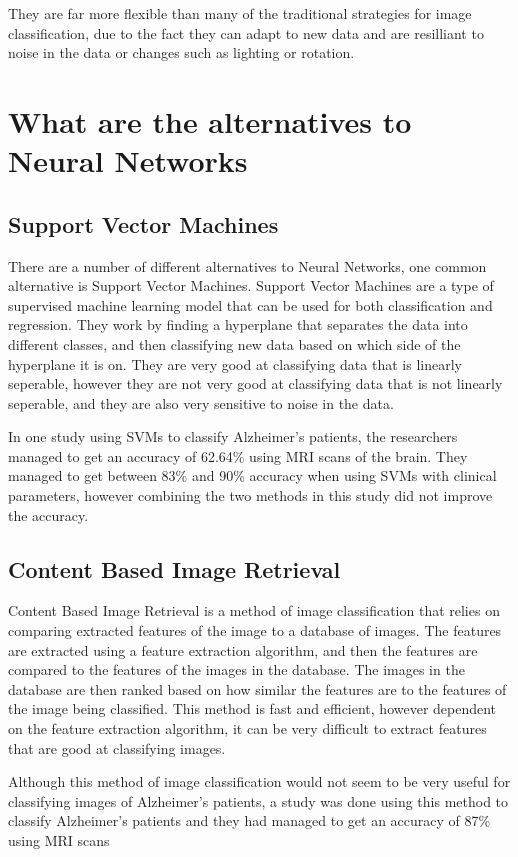 \documentclass[]{final_report}
\begin{document}
They are far more flexible than many of the traditional strategies for image classification, due to the fact they can adapt to new data and are
resilliant to noise in the data or changes such as lighting or rotation.

\pagebreak
\section{What are the alternatives to Neural Networks}
\subsection{Support Vector Machines}
There are a number of different alternatives to Neural Networks, one common alternative is Support Vector Machines.
Support Vector Machines are a type of supervised machine learning model that can be used for both classification and regression.
They work by finding a hyperplane that separates the data into different classes, and then classifying new data based on which side of the hyperplane it is on.
They are very good at classifying data that is linearly seperable, however they are not very good at classifying data that is not linearly seperable,
and they are also very sensitive to noise in the data.

In one study using SVMs to classify Alzheimer's patients, the researchers managed to get an accuracy of 62.64\% using MRI scans of the brain.
They managed to get between 83\% and 90\% accuracy when using SVMs with clinical parameters, however combining the two methods in this study did not improve the accuracy.\cite{10.3389/fneur.2021.640696}

\subsection{Content Based Image Retrieval}
Content Based Image Retrieval is a method of image classification that relies on comparing extracted features of the image to a database of images.
The features are extracted using a feature extraction algorithm, and then the features are compared to the features of the images in the database.
The images in the database are then ranked based on how similar the features are to the features of the image being classified.
This method is fast and efficient, however dependent on the feature extraction algorithm, it can be very difficult to extract features that are good at classifying images.

Although this method of image classification would not seem to be very useful for classifying images of Alzheimer's patients, 
a study was done using this method to classify Alzheimer's patients and they had managed to get an accuracy of 87\% using MRI scans\cite{5972513}
\end{document}

